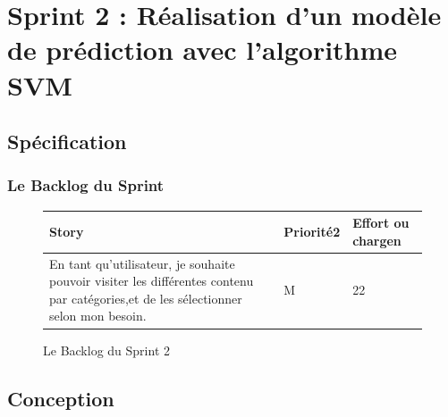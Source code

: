 \chapter{Sprint 2 : Réalisation d’un modèle de prédiction avec l’algorithme SVM}
\label{Chapitre 5} %


\section{Spécification}
\subsection{Le Backlog du Sprint}
\begin{figure}[H]
\begin{tabular}{|p{7cm}|p{4cm}|p{4cm}|}
\hline
\textbf{Story} & \textbf{Priorité2 } & \textbf{Effort ou chargen} \\
\hline
En tant qu'utilisateur, je souhaite pouvoir visiter les différentes contenu par catégories,et de les sélectionner selon mon besoin. & \begin{center}M\end{center} & \begin{center}22\end{center}\\
\hline
\end{tabular}
  \caption{Le Backlog du Sprint 2}
  \label{fig:Backlog2}
\end{figure}
\section{Conception}
